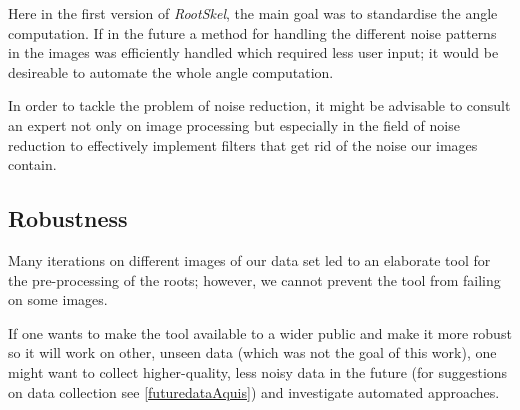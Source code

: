 Here in the first version of \textit{RootSkel}, the main goal was to standardise the angle computation. If in the future  a method for handling the different noise patterns in the images was efficiently handled which required less user input; it would be desireable to automate the whole angle computation.

In order to tackle the problem of noise reduction, it might be advisable to consult an expert not only on image processing but especially in the field of noise reduction to effectively implement filters that get rid of the noise our images contain. 

 

\subsection{Robustness}



Many iterations on different images of our data set led to an elaborate tool for the pre-processing of the roots; however, we cannot prevent the tool from failing on some images. 

If one wants to make the tool available to a wider public and make it more robust so it will work on other, unseen data (which was not the goal of this work), one might want to collect higher-quality, less noisy data in the future (for suggestions on data collection see \ref{futuredataAquis}) and investigate automated approaches. %






